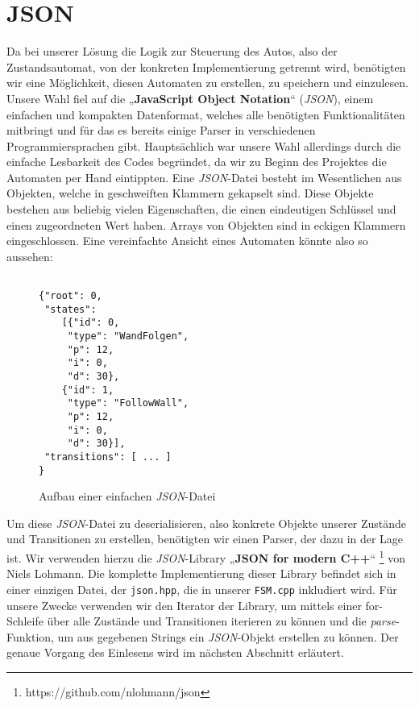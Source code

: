 

\section{JSON}
\label{sec:json}
Da bei unserer Lösung die Logik zur Steuerung des Autos, also der
Zustandsautomat, von der konkreten Implementierung getrennt wird, benötigten
wir eine Möglichkeit, diesen Automaten zu erstellen, zu speichern und einzulesen.
Unsere Wahl fiel auf die „\textbf{JavaScript Object Notation}“ (\textit{JSON}), einem
einfachen und kompakten Datenformat, welches alle benötigten Funktionalitäten
mitbringt und für das es bereits einige Parser in verschiedenen
Programmiersprachen gibt. Hauptsächlich war unsere Wahl allerdings durch die
einfache Lesbarkeit des Codes begründet, da wir zu Beginn des Projektes die
Automaten per Hand eintippten.
Eine \textit{JSON}-Datei besteht im Wesentlichen aus Objekten, welche in geschweiften
Klammern gekapselt sind. Diese Objekte bestehen aus beliebig vielen
Eigenschaften, die einen eindeutigen Schlüssel und einen zugeordneten Wert
haben. Arrays von Objekten sind in eckigen Klammern eingeschlossen. Eine
vereinfachte Ansicht eines Automaten könnte also so aussehen:

\begin{figure}[thp]
\begin{lstlisting}[style=json]

{"root": 0,
 "states":
    [{"id": 0,
     "type": "WandFolgen",
     "p": 12,
     "i": 0,
     "d": 30},       
    {"id": 1,
     "type": "FollowWall",
     "p": 12,
     "i": 0,
     "d": 30}],
 "transitions": [ ... ]
}

\end{lstlisting}
\centering
\caption{Aufbau einer einfachen \textit{JSON}-Datei}
\end{figure}

Um diese \textit{JSON}-Datei zu deserialisieren, also konkrete Objekte unserer Zustände
und Transitionen zu erstellen, benötigten wir einen Parser, der dazu in der Lage
ist. Wir verwenden hierzu die \textit{JSON}-Library „\textbf{JSON for modern C++}“ \footnote[1]{https://github.com/nlohmann/json} von Niels
Lohmann.
Die komplette Implementierung dieser Library befindet sich in einer einzigen
Datei, der \texttt{json.hpp}, die in unserer \texttt{FSM.cpp} inkludiert wird.
Für unsere Zwecke verwenden wir den Iterator der Library, um mittels einer
for-Schleife über alle Zustände und Transitionen iterieren zu können und die
\textit{parse}-Funktion, um aus gegebenen Strings ein \textit{JSON}-Objekt erstellen zu können.
Der genaue Vorgang des Einlesens wird im nächsten Abschnitt erläutert.